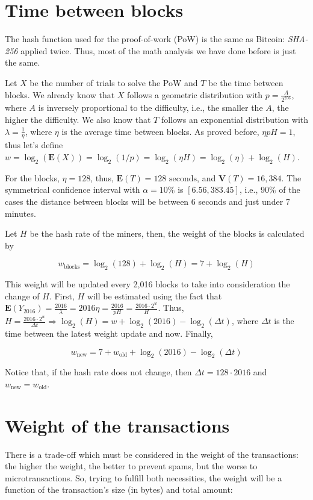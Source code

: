 \section{Time between blocks}

The hash function used for the proof-of-work (PoW) is the same as Bitcoin: \emph{SHA-256} applied twice. Thus, most of the math analysis we have done before is just the same.

Let $X$ be the number of trials to solve the PoW and $T$ be the time between blocks. We already know that $X$ follows a geometric distribution with $p = \frac{A}{2^{256}}$, where $A$ is inversely proportional to the difficulty, i.e., the smaller the $A$, the higher the difficulty. We also know that $T$ follows an exponential distribution with $\lambda = \frac{1}{\eta}$, where $\eta$ is the average time between blocks. As proved before, $\eta p H = 1$, thus let's define $w = \log_2(\mathbf{E}(X)) = \log_2(1/p) = \log_2(\eta H) = \log_2(\eta) + \log_2(H)$.

For the blocks, $\eta = 128$, thus, $\mathbf{E}(T) = 128 \text{ seconds}$, and $\mathbf{V}(T) = 16,384$. The symmetrical confidence interval with $\alpha = 10\%$ is $[6.56, 383.45]$, i.e., 90\% of the cases the distance between blocks will be between 6 seconds and just under 7 minutes.

Let $H$ be the hash rate of the miners, then, the weight of the blocks is calculated by

$$w_\text{blocks} = \log_2(128) + \log_2(H) = 7 + \log_2(H)$$

This weight will be updated every 2,016 blocks to take into consideration the change of $H$. First, $H$ will be estimated using the fact that $\mathbf{E}(Y_{2016}) = \frac{2016}{\lambda} = 2016 \eta = \frac{2016}{pH} = \frac{2016 \cdot 2^w}{H}$. Thus, $H = \frac{2016 \cdot 2^w}{\Delta t} \Rightarrow \log_2(H) = w + \log_2(2016) - \log_2(\Delta t)$, where $\Delta t$ is the time between the latest weight update and now. Finally,

$$w_\text{new} = 7 + w_\text{old} + \log_2(2016) - \log_2(\Delta t)$$

Notice that, if the hash rate does not change, then $\Delta t = 128 \cdot 2016$ and $w_\text{new} = w_\text{old}$.


\section{Weight of the transactions}

There is a trade-off which must be considered in the weight of the transactions: the higher the weight, the better to prevent spams, but the worse to microtransactions. So, trying to fulfill both necessities, the weight will be a function of the transaction's size (in bytes) and total amount:

